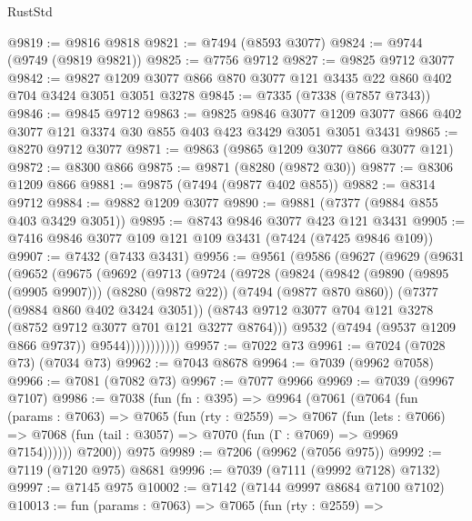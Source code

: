 \begin{lexlean}{RustStd}
\begin{coremodule}
@9819 := @9816 @9818
@9821 := @7494 (@8593 @3077)
@9824 := @9744 (@9749 (@9819 @9821))
@9825 := @7756 @9712
@9827 := @9825 @9712 @3077
@9842 := @9827 @1209 @3077 @866 @870 @3077 @121 @3435 @22 @860 @402 @704 @3424 @3051 @3051 @3278
@9845 := @7335 (@7338 (@7857 @7343))
@9846 := @9845 @9712
@9863 := @9825
    @9846
    @3077
    @1209
    @3077
    @866
    @402
    @3077
    @121
    @3374
    @30
    @855
    @403
    @423
    @3429
    @3051
    @3051
    @3431
@9865 := @8270 @9712 @3077
@9871 := @9863 (@9865 @1209 @3077 @866 @3077 @121)
@9872 := @8300 @866
@9875 := @9871 (@8280 (@9872 @30))
@9877 := @8306 @1209 @866
@9881 := @9875 (@7494 (@9877 @402 @855))
@9882 := @8314 @9712
@9884 := @9882 @1209 @3077
@9890 := @9881 (@7377 (@9884 @855 @403 @3429 @3051))
@9895 := @8743 @9846 @3077 @423 @121 @3431
@9905 := @7416 @9846 @3077 @109 @121 @109 @3431 (@7424 (@7425 @9846 @109))
@9907 := @7432 (@7433 @3431)
@9956 := @9561
    (@9586
      (@9627
        (@9629
          (@9631
            (@9652
              (@9675
                (@9692
                  (@9713
                    (@9724
                      (@9728
                        (@9824
                          (@9842
                            (@9890 (@9895 (@9905 @9907)))
                            (@8280 (@9872 @22))
                            (@7494 (@9877 @870 @860))
                            (@7377 (@9884 @860 @402 @3424 @3051))
                            (@8743
                              @9712
                              @3077
                              @704
                              @121
                              @3278
                              (@8752 @9712 @3077 @701 @121 @3277 @8764)))
                          @9532
                          (@7494 (@9537 @1209 @866 @9737))
                          @9544)))))))))))
@9957 := @7022 @73
@9961 := @7024 (@7028 @73) (@7034 @73)
@9962 := @7043 @8678
@9964 := @7039 (@9962 @7058)
@9966 := @7081 (@7082 @73)
@9967 := @7077 @9966
@9969 := @7039 (@9967 @7107)
@9986 := @7038
    (fun (fn : @395) =>
    @9964
      (@7061
        (@7064
          (fun (params : @7063) =>
          @7065
            (fun (rty : @2559) =>
            @7067
              (fun (lets : @7066) =>
              @7068 (fun (tail : @3057) => @7070 (fun (Γ : @7069) => @9969 @7154))))))
        @7200))
    @975
@9989 := @7206 (@9962 (@7056 @975))
@9992 := @7119 (@7120 @975) @8681
@9996 := @7039 (@7111 (@9992 @7128) @7132)
@9997 := @7145 @975
@10002 := @7142 (@7144 @9997 @8684 @7100 @7102)
@10013 := fun (params : @7063) =>
  @7065
    (fun (rty : @2559) =>

\end{coremodule}
\end{lexlean}
